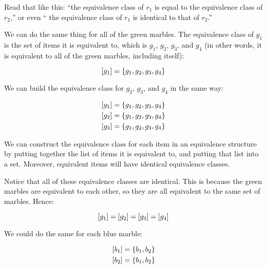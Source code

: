 \documentclass[../../../main.tex]{subfiles}
\begin{document}
Read that like this: ``the equivalence class of $r_{1}$ is equal to the equivalence class of $r_{2}$,'' or even `` the equivalence class of $r_{1}$ is identical to that of $r_{2}$.''

We can do the same thing for all of the green marbles. The equivalence class of $g_{1}$ is the set of items it is equivalent to, which is $g_{1}$, $g_{2}$, $g_{3}$, and $g_{4}$ (in other words, it is equivalent to all of the green marbles, including itself):

\begin{equation*}
  [g_{1}] = \{ g_{1}, g_{2}, g_{3}, g_{4} \}
\end{equation*}

We can build the equivalence class for $g_{2}$, $g_{3}$, and $g_{4}$ in the same way:

\begin{align*}
  \equivclass{g_{1}} &= \{ g_{1}, g_{2}, g_{3}, g_{4} \} \\
  \equivclass{g_{2}} &= \{ g_{1}, g_{2}, g_{3}, g_{4} \} \\
  \equivclass{g_{3}} &= \{ g_{1}, g_{2}, g_{3}, g_{4} \}
\end{align*}

\begin{aside}
  \begin{remark}
    We can construct the equivalence class for each item in an equivalence structure by putting together the list of items it is equivalent to, and putting that list into a set. Moreover, equivalent items will have identical equivalence classes.
  \end{remark}
\end{aside}

Notice that all of these equivalence classes are identical. This is because the green marbles are equivalent to each other, so they are all equivalent to the same set of marbles. Hence:

\begin{equation*}
  [g_{1}] = [g_{2}] = [g_{3}] = [g_{4}]
\end{equation*}

We could do the same for each blue marble:

\begin{align*}
  \equivclass{b_{1}} &= \{ b_{1}, b_{2} \} \\
  \equivclass{b_{2}} &= \{ b_{1}, b_{2} \}
\end{align*}
\end{document}
